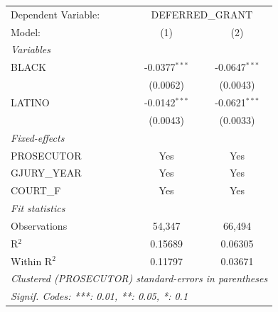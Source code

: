 
\begingroup
\centering
\begin{tabular}{lcc}
   \tabularnewline \midrule \midrule
   Dependent Variable: & \multicolumn{2}{c}{DEFERRED\_GRANT}\\
   Model:       & (1)             & (2)\\  
   \midrule
   \emph{Variables}\\
   BLACK        & -0.0377$^{***}$ & -0.0647$^{***}$\\   
                & (0.0062)        & (0.0043)\\   
   LATINO       & -0.0142$^{***}$ & -0.0621$^{***}$\\   
                & (0.0043)        & (0.0033)\\   
   \midrule
   \emph{Fixed-effects}\\
   PROSECUTOR   & Yes             & Yes\\  
   GJURY\_YEAR  & Yes             & Yes\\  
   COURT\_F     & Yes             & Yes\\  
   \midrule
   \emph{Fit statistics}\\
   Observations & 54,347          & 66,494\\  
   R$^2$        & 0.15689         & 0.06305\\  
   Within R$^2$ & 0.11797         & 0.03671\\  
   \midrule \midrule
   \multicolumn{3}{l}{\emph{Clustered (PROSECUTOR) standard-errors in parentheses}}\\
   \multicolumn{3}{l}{\emph{Signif. Codes: ***: 0.01, **: 0.05, *: 0.1}}\\
\end{tabular}
\par\endgroup


